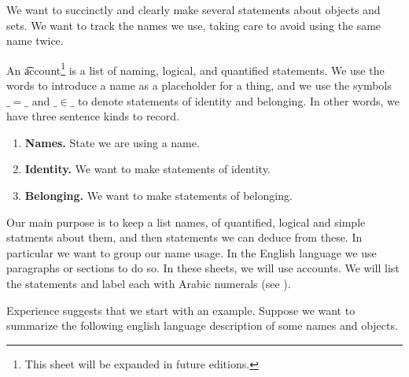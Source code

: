 

We want to succinctly and clearly make several statements about objects and sets. We want to track the names we use, taking care to avoid using the same name twice.


An \t{account}\footnote{This sheet will be expanded in future editions.} is a list of naming, logical, and quantified statements.
We use the words  to introduce a name as a placeholder for a thing, and we use the symbols $\_=\_$ and $\_\in\_$ to denote statements of identity and belonging.
In other words, we have three sentence kinds to record.

\begin{enumerate}

  \item
  \textbf{Names.}
  State we are using a name.

  \item
  \textbf{Identity.}
  We want to make statements of identity.

  \item
  \textbf{Belonging.}
  We want to make statements of belonging.

\end{enumerate}

Our main purpose is to keep a list names, of quantified, logical and simple statments about them, and then statements we can deduce from these.
In particular we want to group our name usage.
In the English language we use paragraphs or sections to do so.
In these sheets, we will use accounts.
We will list the statements and label each with Arabic numerals (see ).

Experience suggests that we start with an example.
Suppose we want to summarize the following english language description of some names and objects.

